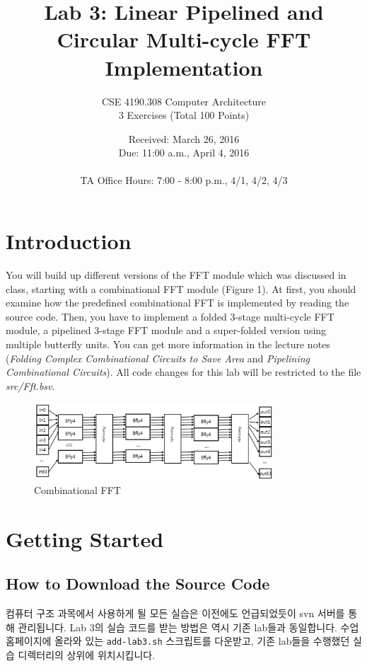 \documentclass{article}
\begin{document}
\title{Lab 3: Linear Pipelined and Circular Multi-cycle FFT Implementation}   %
\author{CSE 4190.308 Computer Architecture \\ 3 Exercises (Total 100 Points)}         
\date{Received: March 26, 2016 \\Due: 11:00 a.m., April 4, 2016\\ \ \\TA Office Hours: 7:00 - 8:00 p.m., 4/1, 4/2, 4/3}    %
\maketitle

\section{Introduction}
You will build up different versions of the FFT module which was discussed in
class, starting with a combinational FFT module (Figure 1). At first, you should examine
how the predefined combinational FFT is implemented by reading the source code.
Then, you have to implement a folded 3-stage multi-cycle FFT module, a pipelined 
3-stage FFT module and a super-folded version using multiple butterfly units. 
You can get more information in the lecture notes (\textit{Folding Complex Combinational 
Circuits to Save Area} and \textit{Pipelining Combinational Circuits}).
All code changes for this lab will be restricted to the file \emph{src/Fft.bsv}.

\begin{figure}[!h]
\centering
\includegraphics[width=0.8\textwidth]{figs/comb.png}
\caption{Combinational FFT}
\label{Comb}
\end{figure}

\section{Getting Started}
\subsection{How to Download the Source Code}
컴퓨터 구조 과목에서 사용하게 될 모든 실습은 이전에도 언급되었듯이 svn 서버를 통해 관리됩니다.
Lab 3의 실습 코드를 받는 방법은 역시 기존 lab들과 동일합니다.
수업 홈페이지에 올라와 있는 \texttt{add-lab3.sh} 스크립트를 다운받고,
기존 lab들을 수행했던 실습 디렉터리의 상위에 위치시킵니다.
\end{document}
